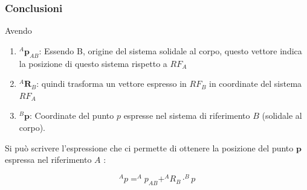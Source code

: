 \documentclass[11pt, a4paper]{report}
\begin{document}
\subsubsection{Conclusioni}
\noindent
\begin{minipage}{0.5\textwidth}
\end{minipage}
\hfill
\begin{minipage}{0.5\textwidth}
Avendo
\begin{enumerate}
    \item \( ^{A}\mathbf{p}_{AB} \): Essendo B, origine del sistema solidale al corpo, questo vettore indica la posizione di questo sistema rispetto a $RF_{A}$

    \item \( ^{A}\mathbf{R}_{B} \): quindi trasforma un vettore espresso in $RF_{B}$ in coordinate del sistema $RF_{A}$

    \item \( ^{B}\mathbf{p} \): Coordinate del punto \( p \) espresse nel sistema di riferimento \( B \) (solidale al corpo).
\end{enumerate}

Si può scrivere l'espressione che ci permette di ottenere la posizione del punto \( \mathbf{p} \) espressa nel riferimento \( A \) :

\[
	^{A}p = ^{A}p_{AB} + ^{A}R_{B} \cdot ^{B}p
\]

\end{minipage}
\end{document}
